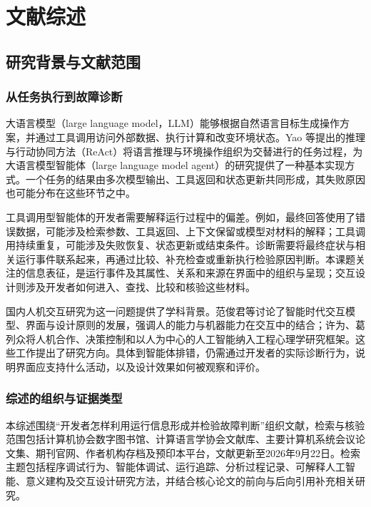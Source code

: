 \chapter{文献综述}\label{chap:literature-review}

\section{研究背景与文献范围}

\subsection{从任务执行到故障诊断}

大语言模型（large language model，LLM）能够根据自然语言目标生成操作方案，并通过工具调用访问外部数据、执行计算和改变环境状态。Yao 等\cite{yao2023react}提出的推理与行动协同方法（ReAct）将语言推理与环境操作组织为交替进行的任务过程，为大语言模型智能体（large language model agent）的研究提供了一种基本实现方式。一个任务的结果由多次模型输出、工具返回和状态更新共同形成，其失败原因也可能分布在这些环节之中。

工具调用型智能体的开发者需要解释运行过程中的偏差。例如，最终回答使用了错误数据，可能涉及检索参数、工具返回、上下文保留或模型对材料的解释；工具调用持续重复，可能涉及失败恢复、状态更新或结束条件。诊断需要将最终症状与相关运行事件联系起来，再通过比较、补充检查或重新执行检验原因判断。本课题关注的信息表征，是运行事件及其属性、关系和来源在界面中的组织与呈现；交互设计则涉及开发者如何进入、查找、比较和核验这些材料。

国内人机交互研究为这一问题提供了学科背景。范俊君等\cite{ref42}讨论了智能时代交互模型、界面与设计原则的发展，强调人的能力与机器能力在交互中的结合；许为、葛列众\cite{ref63}将人机合作、决策控制和以人为中心的人工智能纳入工程心理学研究框架。这些工作提出了研究方向。具体到智能体排错，仍需通过开发者的实际诊断行为，说明界面应支持什么活动，以及设计效果如何被观察和评价。

\subsection{综述的组织与证据类型}

本综述围绕“开发者怎样利用运行信息形成并检验故障判断”组织文献，检索与核验范围包括计算机协会数字图书馆、计算语言学协会文献库、主要计算机系统会议论文集、期刊官网、作者机构存档及预印本平台，文献更新至2026年9月22日。检索主题包括程序调试行为、智能体调试、运行追踪、分析过程记录、可解释人工智能、意义建构及交互设计研究方法，并结合核心论文的前向与后向引用补充相关研究。

